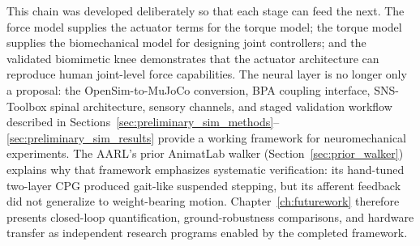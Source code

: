 This chain was developed deliberately so that each stage can feed the next. The force model supplies the actuator terms for the torque model; the torque model supplies the biomechanical model for designing joint controllers; and the validated biomimetic knee demonstrates that the actuator architecture can reproduce human joint-level force capabilities. The neural layer is no longer only a proposal: the OpenSim-to-MuJoCo conversion, BPA coupling interface, SNS-Toolbox spinal architecture, sensory channels, and staged validation workflow described in Sections~\ref{sec:preliminary_sim_methods}--\ref{sec:preliminary_sim_results} provide a working framework for neuromechanical experiments. The AARL's prior AnimatLab walker (Section~\ref{sec:prior_walker}) explains why that framework emphasizes systematic verification: its hand-tuned two-layer CPG produced gait-like suspended stepping, but its afferent feedback did not generalize to weight-bearing motion. Chapter~\ref{ch:futurework} therefore presents closed-loop quantification, ground-robustness comparisons, and hardware transfer as independent research programs enabled by the completed framework.
